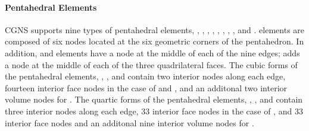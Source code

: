 {{{\paragraph{Pentahedral Elements}
CGNS supports nine types of pentahedral elements, ,
, , , , ,
, , and .
 elements are composed of six nodes located at the
six geometric corners of the pentahedron.
In addition,  and  elements have a node
at the middle of each of the nine edges;  adds a
node at the middle of each of the three quadrilateral faces.
The cubic forms of the pentahedral elements, ,
, and 
contain two interior nodes along each edge, fourteen interior face nodes
in the case of  and , and an additonal
two interior volume nodes for .
The quartic forms of the pentahedral elements,
, , and 
contain three interior nodes along each edge, 33 interior face nodes
in the case of , and 33 interior face nodes and an additonal
nine interior volume nodes for .

\newpage
{}

}}}
